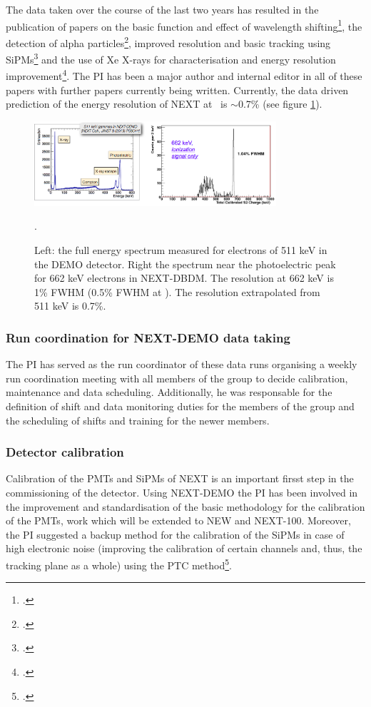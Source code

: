 \documentclass[a4paper,11pt,oneside]{article}
\begin{document}
The data taken over the course of the last two years has resulted in the publication of papers on the basic function and effect of wavelength shifting\footcite{Alvarez:2012xda}, the detection of alpha particles\footcite{Alvarez:2012hu}, improved resolution and basic tracking using SiPMs\footcite{Alvarez:2013gxa} and the use of Xe X-rays for characterisation and energy resolution improvement\footcite{Lorca:2014sra}. The PI has been a major author and internal editor in all of these papers with further papers currently being written. Currently, the data driven prediction of the energy resolution of NEXT at \Qbb\ is $\sim$0.7\% (see figure \ref{fig.ERES}).
\begin{figure}
  \centering
  \includegraphics[width=0.8\textwidth]{img/EResolution.png}
  \caption{\small Left: the full energy spectrum measured for electrons of 511 keV in the DEMO detector. Right the spectrum near the photoelectric peak for 662 keV electrons in NEXT-DBDM. The resolution at 662 keV is 1\% FWHM (0.5\% FWHM at \Qbb). The resolution extrapolated from 511 keV is 0.7\%.}\label{fig.ERES}. 
\end{figure}

\subsubsection*{Run coordination for NEXT-DEMO data taking}
The PI has served as the run coordinator of these data runs organising a weekly run coordination meeting with all members of the group to decide calibration, maintenance and data scheduling. Additionally, he was responsable for the definition of shift and data monitoring duties for the members of the group and the scheduling of shifts and training for the newer members.

\subsubsection*{Detector calibration}
Calibration of the PMTs and SiPMs of NEXT is an important firsst step in the commissioning of the detector. Using NEXT-DEMO the PI has been involved in the improvement and standardisation of the basic methodology for the calibration of the PMTs, work which will be extended to NEW and NEXT-100. Moreover, the PI suggested a backup method for the calibration of the SiPMs in case of high electronic noise (improving the calibration of certain channels and, thus, the tracking plane as a whole) using the PTC method\footcite{Janesick:2001}.
\end{document}
